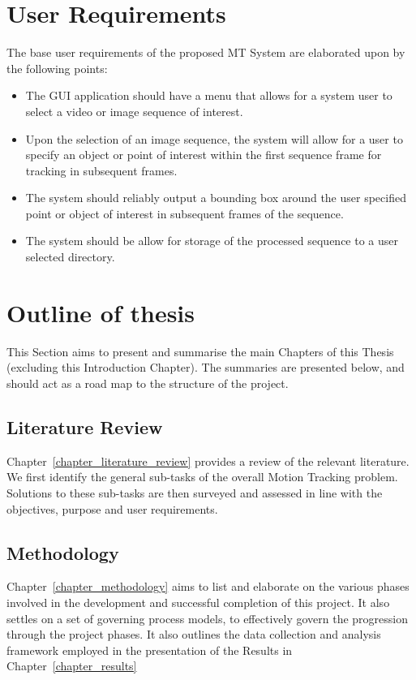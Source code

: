 \section{User Requirements}\label{introduction_user_requirements}
The base user requirements of the proposed MT System are elaborated upon by the
following points:
\begin{itemize}
    \item The GUI application should have a menu that allows for a system
        user to select a video or image sequence of interest.
    \item Upon the selection of an image sequence, the system will allow for a
        user to specify an object or point of interest within the first sequence
        frame for tracking in subsequent frames.
    \item The system should reliably output a bounding box around the user
        specified point or object of interest in subsequent frames of the
        sequence. 
    \item The system should be allow for storage of the processed sequence to
        a user selected directory.
\end{itemize}

\section{Outline of thesis}
This Section aims to present and summarise the main Chapters of this Thesis
(excluding this Introduction Chapter). The summaries are presented below, and
should act as a road map to the structure of the project.

\subsection{Literature Review}
Chapter~\ref{chapter_literature_review} provides a review of the
relevant literature. We first identify the general sub-tasks of the overall
Motion Tracking problem. Solutions to these sub-tasks are then surveyed and
assessed in line with the objectives, purpose and user requirements. 

\subsection{Methodology}
Chapter~\ref{chapter_methodology} aims to list and elaborate on the various
phases involved in the development and successful completion of this project. It
also settles on a set of governing process models, to effectively govern the progression
through the project phases. It also outlines the data collection and analysis 
framework employed in the presentation of the Results in Chapter~\ref{chapter_results}

